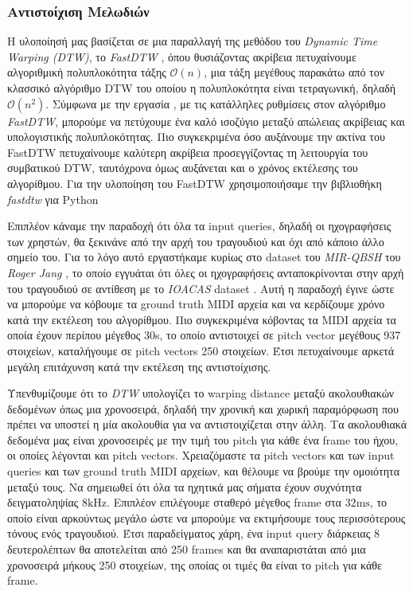 \subsubsection{Αντιστοίχιση Μελωδιών}

Η υλοποίησή μας βασίζεται σε μια παραλλαγή της μεθόδου του \emph{Dynamic Time Warping (DTW)}, το \emph{FastDTW} \cite{salvador2007toward},
όπου θυσιάζοντας ακρίβεια πετυχαίνουμε αλγοριθμική πολυπλοκότητα τάξης $\mathcal{O}(n)$, μια τάξη μεγέθους παρακάτω από τον κλασσικό
αλγόριθμο DTW του οποίου η πολυπλοκότητα είναι τετραγωνική, δηλαδή $\mathcal{O}(n^2)$. Σύμφωνα με την εργασία \cite{salvador2007toward},
με τις κατάλληλες ρυθμίσεις στον αλγόριθμο \emph{FastDTW}, μπορούμε να πετύχουμε ένα καλό ισοζύγιο μεταξύ απώλειας ακρίβειας και
υπολογιστικής πολυπλοκότητας. Πιο συγκεκριμένα όσο αυξάνουμε την ακτίνα του FastDTW πετυχαίνουμε καλύτερη ακρίβεια προσεγγίζοντας τη λειτουργία του συμβατικού DTW, ταυτόχρονα όμως αυξάνεται και ο χρόνος εκτέλεσης του αλγορίθμου. Για την υλοποίηση του FastDTW χρησιμοποιήσαμε την βιβλιοθήκη \emph{fastdtw} για Python \cite{fastdtwpython}

Επιπλέον κάναμε την παραδοχή ότι όλα τα input queries, δηλαδή οι ηχογραφήσεις των
χρηστών, θα ξεκινάνε από την αρχή του τραγουδιού και όχι από κάποιο άλλο σημείο του. Για το λόγο αυτό εργαστήκαμε κυρίως στο dataset του
\emph{MIR-QBSH} του \emph{Roger Jang} \cite{jang-dataset}, το οποίο εγγυάται ότι όλες οι ηχογραφήσεις ανταποκρίνονται στην αρχή του
τραγουδιού σε αντίθεση με το \emph{IOACAS} dataset \cite{IOACAS-dataset}. Αυτή η παραδοχή έγινε ώστε να 
μπορούμε να κόβουμε τα ground truth MIDI αρχεία και να κερδίζουμε χρόνο κατά την εκτέλεση του αλγορίθμου. Πιο 
συγκεκριμένα κόβοντας τα MIDI αρχεία τα οποία έχουν περίπου μέγεθος 30s, το οποίο αντιστοιχεί σε pitch vector 
μεγέθους 937 στοιχείων, καταλήγουμε σε pitch vectors 250 στοιχείων. Έτσι πετυχαίνουμε αρκετά μεγάλη επιτάχυνση 
κατά την εκτέλεση της αντιστοίχισης. 

Υπενθυμίζουμε ότι το \emph{DTW} υπολογίζει το warping distance μεταξύ ακολουθιακών δεδομένων όπως μια χρονοσειρά, δηλαδή την χρονική και
χωρική παραμόρφωση που πρέπει να υποστεί η μία ακολουθία για να αντιστοιχίζεται στην άλλη. Τα ακολουθιακά δεδομένα μας είναι χρονοσειρές
με την τιμή του pitch για κάθε ένα frame του ήχου, οι οποίες λέγονται και pitch vectors. Χρειαζόμαστε τα pitch vectors και των input queries
και των ground truth MIDI αρχείων, και θέλουμε να βρούμε την ομοιότητα μεταξύ τους. Να σημειωθεί ότι όλα τα ηχητικά μας σήματα έχουν
συχνότητα δειγματοληψίας $8 \mathrm{ kHz}$. Επιπλέον επιλέγουμε σταθερό μέγεθος frame στα $32 \mathrm{ ms}$, το οποίο είναι αρκούντως
μεγάλο ώστε να μπορούμε να εκτιμήσουμε τους περισσότερους τόνους ενός τραγουδιού. Έτσι παραδείγματος χάρη, ένα input query διάρκειας 8
δευτερολέπτων θα αποτελείται από 250 frames και θα αναπαριστάται από μια χρονοσειρά μήκους 250 στοιχείων, της οποίας οι τιμές θα είναι το
pitch για κάθε frame.
